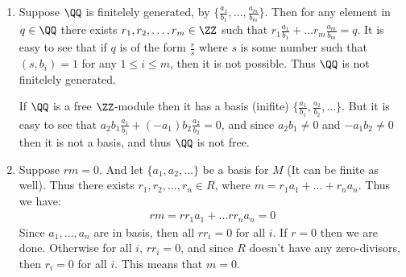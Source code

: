 \begin{enumerate}[label=\ilabel]
    \item 
        Suppose $\QQ$ is finitelely generated, by $\{\frac{a_1}{b_1}, \dots, \frac{a_m}{b_m} \}$. Then for any element in $q \in \QQ$ there exists $r_1, r_2, \dots, r_m \in \ZZ$ such that $r_1 \frac{a_1}{b_1} + \dots r_m \frac{a_m}{b_m} = q$. It is easy to see that if $q$ is of the form $\frac{r}{s}$ where $s$ is some number such that $(s, b_i) = 1$ for any $1 \le i \le m$, then it is not possible. Thus $\QQ$ is not finitelely generated. 

        If $\QQ$ is a free $\ZZ$-module then it has a basis (inifite) $\{\frac{a_1}{b_1}, \frac{a_2}{b_2}, \dots \}$. But it is easy to see that $a_2 b_1 \frac{a_1}{b_1} + (-a_1) b_2 \frac{a_2}{b_2} = 0$, and since $a_2b_1 \ne 0$ and $-a_1 b_2 \ne 0$ then it is not a basis, and thus $\QQ$ is not free.

    \item
        Suppose $rm = 0$. And let $\{a_1, a_2, \dots\}$ be a basis for $M$ (It can be finite as well). Thus there exists $r_1, r_2, \dots, r_n \in R$, where $m = r_1 a_1 + \dots + r_n a_n$. Thus we have:
        \begin{gather*}
            rm = rr_1 a_1 + \dots rr_n a_n = 0
        \end{gather*}
        Since $a_1, \dots, a_n$ are in basis, then all $rr_i = 0$ for all $i$. If $r = 0$ then we are done. Otherwise for all $i$, $rr_i = 0$, and since $R$ doesn't have any zero-divisors, then $r_i = 0$ for all $i$. This means that $m = 0$.
\end{enumerate}